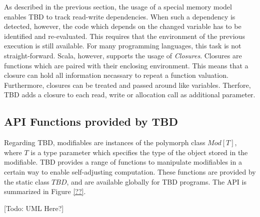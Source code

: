 As described in the previous section, the usage of a special memory model enables TBD to track read-write dependencies. When such a dependency is detected, however, the code which depends on the changed variable has to be identified and re-evaluated. This requires that the environment of the previous execution is still available. For many programming languages, this task is not straight-forward. Scala, however, supports the usage of \textit{Closures}. Closures are functions which are paired with their enclosing environment. This means that a closure can hold all information necassary to repeat a function valuation. Furthermore, closures can be treated and passed around like variables. Therfore, TBD adds a closure to each read, write or allocation call as additional parameter.


\subsection{API Functions provided by TBD} 

Regarding TBD, modifiables are instances of the polymorph class $Mod[T]$, where $T$ is a type parameter which specifies the type of the object stored in the modifiable. TBD provides a range of functions to manipulate modifiables in a certain way to enable self-adjusting computation. These functions are provided by the static class $TBD$, and are available globally for TBD programs. The API is summarized in Figure \ref{??}. 

[Todo: UML Here?]

